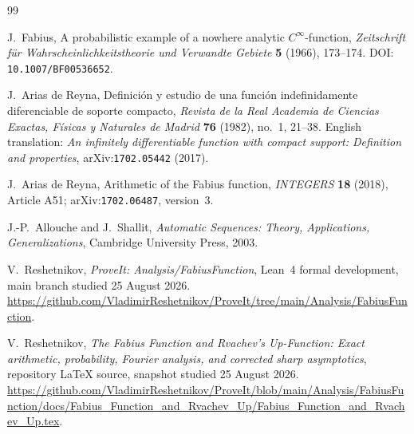 \documentclass[11pt,oneside]{article}
\theoremstyle{definition}
\theoremstyle{remark}
\begin{document}
\begin{thebibliography}{99}

J.~Fabius,
\newblock A probabilistic example of a nowhere analytic $C^\infty$-function,
\newblock \emph{Zeitschrift für Wahrscheinlichkeitstheorie und Verwandte Gebiete}
  \textbf{5} (1966), 173--174.
\newblock DOI: \nolinkurl{10.1007/BF00536652}.

J.~Arias de Reyna,
\newblock Definición y estudio de una función indefinidamente diferenciable de
  soporte compacto,
\newblock \emph{Revista de la Real Academia de Ciencias Exactas, Físicas y
  Naturales de Madrid} \textbf{76} (1982), no.~1, 21--38.
\newblock English translation: \emph{An infinitely differentiable function with
  compact support: Definition and properties}, arXiv:\nolinkurl{1702.05442} (2017).

J.~Arias de Reyna,
\newblock Arithmetic of the Fabius function,
\newblock \emph{INTEGERS} \textbf{18} (2018), Article A51;
  arXiv:\nolinkurl{1702.06487}, version~3.

J.-P.~Allouche and J.~Shallit,
\newblock \emph{Automatic Sequences: Theory, Applications, Generalizations},
\newblock Cambridge University Press, 2003.

V.~Reshetnikov,
\newblock \emph{ProveIt: Analysis/FabiusFunction},
\newblock Lean~4 formal development, main branch studied 25 August 2026.
\newblock \url{https://github.com/VladimirReshetnikov/ProveIt/tree/main/Analysis/FabiusFunction}.

V.~Reshetnikov,
\newblock \emph{The Fabius Function and Rvachev's Up-Function: Exact arithmetic,
  probability, Fourier analysis, and corrected sharp asymptotics},
\newblock repository LaTeX source, snapshot studied 25 August 2026.
\newblock \url{https://github.com/VladimirReshetnikov/ProveIt/blob/main/Analysis/FabiusFunction/docs/Fabius_Function_and_Rvachev_Up/Fabius_Function_and_Rvachev_Up.tex}.

\end{thebibliography}
\end{document}
